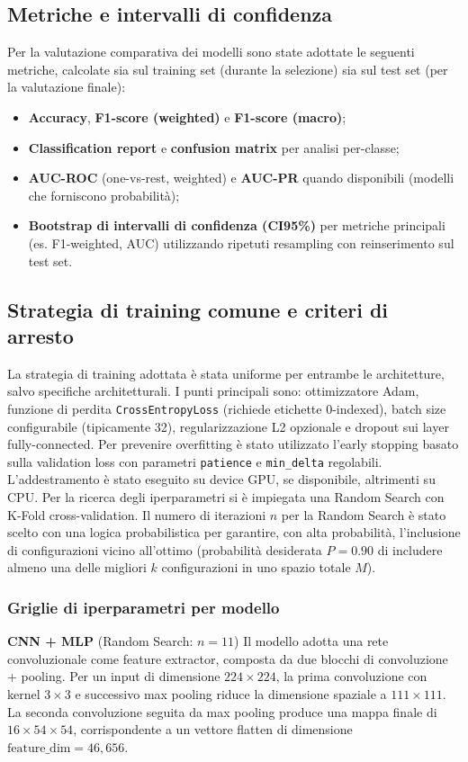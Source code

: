 \documentclass[a4paper,12pt]{report}
\begin{document}
	\subsection{Metriche e intervalli di confidenza}
	Per la valutazione comparativa dei modelli sono state adottate le seguenti metriche, calcolate sia sul training set (durante la selezione) sia sul test set (per la valutazione finale):
	\begin{itemize}
		\item \textbf{Accuracy}, \textbf{F1-score (weighted)} e \textbf{F1-score (macro)};
		\item \textbf{Classification report} e \textbf{confusion matrix} per analisi per-classe;
		\item \textbf{AUC-ROC} (one-vs-rest, weighted) e \textbf{AUC-PR} quando disponibili (modelli che forniscono probabilità);
		\item \textbf{Bootstrap di intervalli di confidenza (CI95\%)} per metriche principali (es. F1-weighted, AUC) utilizzando ripetuti resampling con reinserimento sul test set.
	\end{itemize}
	
	\subsection{Strategia di training comune e criteri di arresto}
	La strategia di training adottata è stata uniforme per entrambe le architetture, salvo specifiche architetturali. I punti principali sono: ottimizzatore Adam, funzione di perdita \texttt{CrossEntropyLoss} (richiede etichette 0-indexed), batch size configurabile (tipicamente 32), regularizzazione L2 opzionale e dropout sui layer fully-connected. Per prevenire overfitting è stato utilizzato l'early stopping basato sulla validation loss con parametri \texttt{patience} e \texttt{min\_delta} regolabili. L'addestramento è stato eseguito su device GPU, se disponibile, altrimenti su CPU. Per la ricerca degli iperparametri si è impiegata una Random Search con K-Fold cross-validation. Il numero di iterazioni \(n\) per la Random Search è stato scelto con una logica probabilistica per garantire, con alta probabilità, l'inclusione di configurazioni vicino all'ottimo (probabilità desiderata \(P=0.90\) di includere almeno una delle migliori \(k\) configurazioni in uno spazio totale \(M\)).
	
	\subsubsection{Griglie di iperparametri per modello} 
	\smallskip
	\noindent\textbf{CNN + MLP} \quad (Random Search: $n=11$)  
	Il modello adotta una rete convoluzionale come feature extractor, composta da due blocchi di convoluzione + pooling. Per un input di dimensione \(224\times224\), la prima convoluzione con kernel \(3\times3\) e successivo max pooling riduce la dimensione spaziale a \(111\times111\). La seconda convoluzione seguita da max pooling produce una mappa finale di \(16\times54\times54\), corrispondente a un vettore flatten di dimensione \(\text{feature\_dim} = 46,656\).
	
\end{document}
